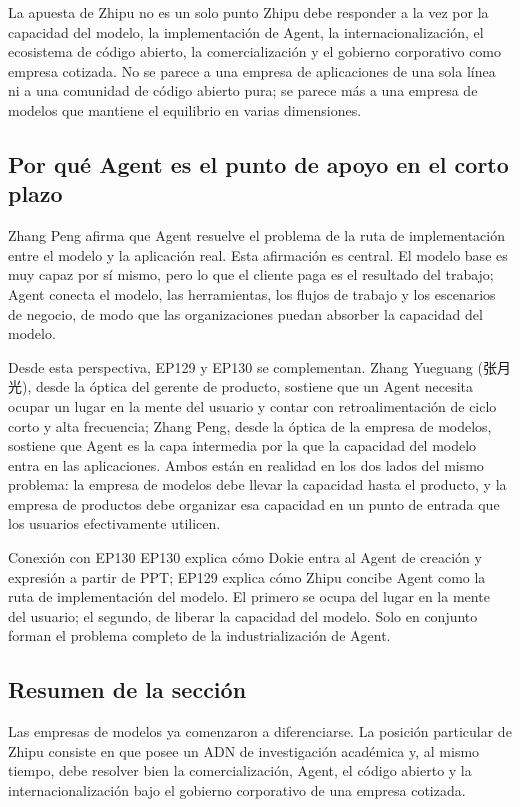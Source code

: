 \begin{importantbox}{La apuesta de Zhipu no es un solo punto}
Zhipu debe responder a la vez por la capacidad del modelo, la implementación de Agent, la internacionalización, el ecosistema de código abierto, la comercialización y el gobierno corporativo como empresa cotizada. No se parece a una empresa de aplicaciones de una sola línea ni a una comunidad de código abierto pura; se parece más a una empresa de modelos que mantiene el equilibrio en varias dimensiones.
\end{importantbox}

\subsection{Por qué Agent es el punto de apoyo en el corto plazo}

Zhang Peng afirma que Agent resuelve el problema de la ruta de implementación entre el modelo y la aplicación real. Esta afirmación es central. El modelo base es muy capaz por sí mismo, pero lo que el cliente paga es el resultado del trabajo; Agent conecta el modelo, las herramientas, los flujos de trabajo y los escenarios de negocio, de modo que las organizaciones puedan absorber la capacidad del modelo.

Desde esta perspectiva, EP129 y EP130 se complementan. Zhang Yueguang (张月光), desde la óptica del gerente de producto, sostiene que un Agent necesita ocupar un lugar en la mente del usuario y contar con retroalimentación de ciclo corto y alta frecuencia; Zhang Peng, desde la óptica de la empresa de modelos, sostiene que Agent es la capa intermedia por la que la capacidad del modelo entra en las aplicaciones. Ambos están en realidad en los dos lados del mismo problema: la empresa de modelos debe llevar la capacidad hasta el producto, y la empresa de productos debe organizar esa capacidad en un punto de entrada que los usuarios efectivamente utilicen.

\begin{knowledgebox}{Conexión con EP130}
EP130 explica cómo Dokie entra al Agent de creación y expresión a partir de PPT; EP129 explica cómo Zhipu concibe Agent como la ruta de implementación del modelo. El primero se ocupa del lugar en la mente del usuario; el segundo, de liberar la capacidad del modelo. Solo en conjunto forman el problema completo de la industrialización de Agent.
\end{knowledgebox}

\subsection{Resumen de la sección}

Las empresas de modelos ya comenzaron a diferenciarse. La posición particular de Zhipu consiste en que posee un ADN de investigación académica y, al mismo tiempo, debe resolver bien la comercialización, Agent, el código abierto y la internacionalización bajo el gobierno corporativo de una empresa cotizada.

